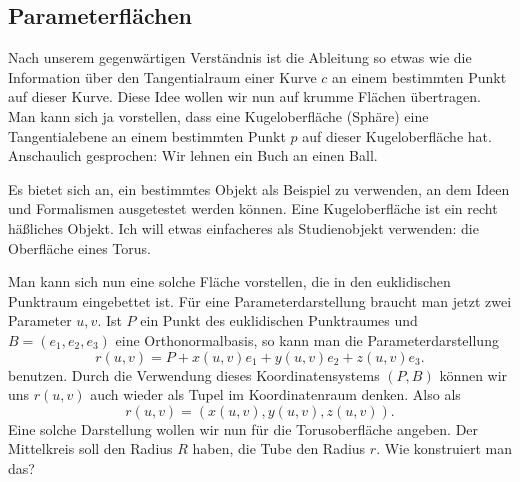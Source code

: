 \documentclass[a4paper,12pt,fleqn]{article}
\begin{document}
\subsection{Parameterflächen}
Nach unserem gegenwärtigen Verständnis ist die Ableitung so etwas
wie die Information über den Tangentialraum einer Kurve \(c\) an
einem bestimmten Punkt auf dieser Kurve. Diese Idee wollen wir nun
auf krumme Flächen übertragen. Man kann sich ja vorstellen, dass
eine Kugeloberfläche (Sphäre) eine Tangentialebene an einem bestimmten
Punkt \(p\) auf dieser Kugeloberfläche hat. Anschaulich gesprochen:
Wir lehnen ein Buch an einen Ball.

Es bietet sich an, ein bestimmtes Objekt als Beispiel zu verwenden,
an dem Ideen und Formalismen ausgetestet werden können.
Eine Kugeloberfläche ist ein recht häßliches Objekt. Ich will etwas
einfacheres als Studienobjekt verwenden: die Oberfläche eines Torus.

Man kann sich nun eine solche Fläche vorstellen, die in den
euklidischen Punktraum eingebettet ist. Für eine Parameterdarstellung
braucht man jetzt zwei Parameter \(u,v\). Ist \(P\) ein Punkt
des euklidischen Punktraumes und \(B=(e_1,e_2,e_3)\) eine
Orthonormalbasis, so kann man die Parameterdarstellung
\begin{equation}\label{Flaeche}
r(u,v) = P+x(u,v)e_1+y(u,v)e_2+z(u,v)e_3.
\end{equation}
benutzen. Durch die Verwendung dieses Koordinatensystems \((P,B)\)
können wir uns \(r(u,v)\) auch wieder als Tupel im Koordinatenraum
denken. Also als
\begin{equation}
r(u,v) = (x(u,v),y(u,v),z(u,v)).
\end{equation}
Eine solche Darstellung wollen wir nun für die Torusoberfläche
angeben. Der Mittelkreis soll den Radius \(R\) haben, die Tube
den Radius \(r\). Wie konstruiert man das?
\end{document}
